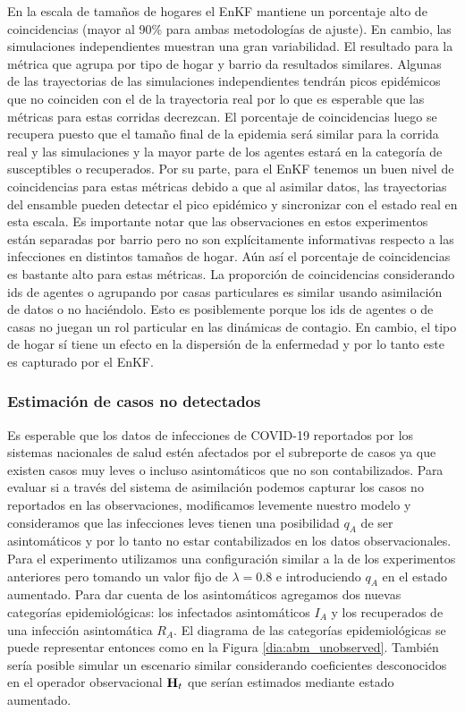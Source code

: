 En la escala de tamaños de hogares el EnKF mantiene un porcentaje alto de coincidencias (mayor al 90\% para ambas metodologías de ajuste). En cambio, las simulaciones independientes muestran una gran variabilidad. El resultado para la métrica que agrupa por tipo de hogar y barrio da resultados similares. Algunas de las trayectorias de las simulaciones independientes tendrán picos epidémicos que no coinciden con el de la trayectoria real por lo que es esperable que las métricas para estas corridas decrezcan. El porcentaje de coincidencias luego se recupera puesto que el tamaño final de la epidemia será similar para la corrida real y las simulaciones y la mayor parte de los agentes estará en la categoría de susceptibles o recuperados. Por su parte, para el EnKF tenemos un buen nivel de coincidencias para estas métricas debido a que al asimilar datos, las trayectorias del ensamble pueden detectar el pico epidémico y sincronizar con el estado real en esta escala. Es importante notar que las observaciones en estos experimentos están separadas por barrio pero no son explícitamente informativas respecto a las infecciones en distintos tamaños de hogar. Aún así el porcentaje de coincidencias es bastante alto para estas métricas. La proporción de coincidencias considerando ids de agentes o agrupando por casas particulares es similar usando asimilación de datos o no haciéndolo. Esto es posiblemente porque los ids de agentes o de casas no juegan un rol particular en las dinámicas de contagio. En cambio, el tipo de hogar sí tiene un efecto en la dispersión de la enfermedad y por lo tanto este es capturado por el EnKF.

\subsubsection{Estimación de casos no detectados}

Es esperable que los datos de infecciones de COVID-19 reportados por los sistemas nacionales de salud estén afectados por el subreporte de casos ya que existen casos muy leves o incluso asintomáticos que no son contabilizados. Para evaluar si a través del sistema de asimilación podemos capturar los casos no reportados en las observaciones, modificamos levemente nuestro modelo y consideramos que las infecciones leves tienen una posibilidad $q_A$ de ser asintomáticos y por lo tanto no estar contabilizados en los datos observacionales. Para el experimento utilizamos una configuración similar a la de los experimentos anteriores pero tomando un valor fijo de $\lambda = 0.8$ e introduciendo $q_A$ en el estado aumentado. Para dar cuenta de los asintomáticos agregamos dos nuevas categorías epidemiológicas: los infectados asintomáticos $I_A$ y los recuperados de una infección asintomática $R_A$. El diagrama de las categorías epidemiológicas se puede representar entonces como en la Figura \ref{dia:abm_unobserved}. También sería posible simular un escenario similar considerando coeficientes desconocidos en el operador observacional $\mathbf{H}_t$ que serían estimados mediante estado aumentado.

